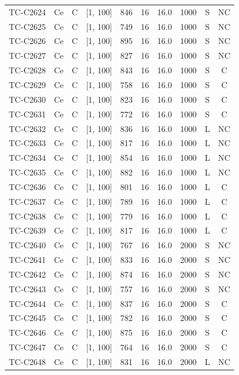 \begin{longtable}{lccccccccc}
TC-C2624 & Ce & C & [1, 100] & 846 & 16 & 16.0 & 1000 & S & NC \\
TC-C2625 & Ce & C & [1, 100] & 749 & 16 & 16.0 & 1000 & S & NC \\
TC-C2626 & Ce & C & [1, 100] & 895 & 16 & 16.0 & 1000 & S & NC \\
TC-C2627 & Ce & C & [1, 100] & 827 & 16 & 16.0 & 1000 & S & NC \\
TC-C2628 & Ce & C & [1, 100] & 843 & 16 & 16.0 & 1000 & S & C \\
TC-C2629 & Ce & C & [1, 100] & 758 & 16 & 16.0 & 1000 & S & C \\
TC-C2630 & Ce & C & [1, 100] & 823 & 16 & 16.0 & 1000 & S & C \\
TC-C2631 & Ce & C & [1, 100] & 772 & 16 & 16.0 & 1000 & S & C \\
TC-C2632 & Ce & C & [1, 100] & 836 & 16 & 16.0 & 1000 & L & NC \\
TC-C2633 & Ce & C & [1, 100] & 817 & 16 & 16.0 & 1000 & L & NC \\
TC-C2634 & Ce & C & [1, 100] & 854 & 16 & 16.0 & 1000 & L & NC \\
TC-C2635 & Ce & C & [1, 100] & 882 & 16 & 16.0 & 1000 & L & NC \\
TC-C2636 & Ce & C & [1, 100] & 801 & 16 & 16.0 & 1000 & L & C \\
TC-C2637 & Ce & C & [1, 100] & 789 & 16 & 16.0 & 1000 & L & C \\
TC-C2638 & Ce & C & [1, 100] & 779 & 16 & 16.0 & 1000 & L & C \\
TC-C2639 & Ce & C & [1, 100] & 817 & 16 & 16.0 & 1000 & L & C \\
TC-C2640 & Ce & C & [1, 100] & 767 & 16 & 16.0 & 2000 & S & NC \\
TC-C2641 & Ce & C & [1, 100] & 833 & 16 & 16.0 & 2000 & S & NC \\
TC-C2642 & Ce & C & [1, 100] & 874 & 16 & 16.0 & 2000 & S & NC \\
TC-C2643 & Ce & C & [1, 100] & 757 & 16 & 16.0 & 2000 & S & NC \\
TC-C2644 & Ce & C & [1, 100] & 837 & 16 & 16.0 & 2000 & S & C \\
TC-C2645 & Ce & C & [1, 100] & 782 & 16 & 16.0 & 2000 & S & C \\
TC-C2646 & Ce & C & [1, 100] & 875 & 16 & 16.0 & 2000 & S & C \\
TC-C2647 & Ce & C & [1, 100] & 764 & 16 & 16.0 & 2000 & S & C \\
TC-C2648 & Ce & C & [1, 100] & 831 & 16 & 16.0 & 2000 & L & NC \\

\end{longtable}
